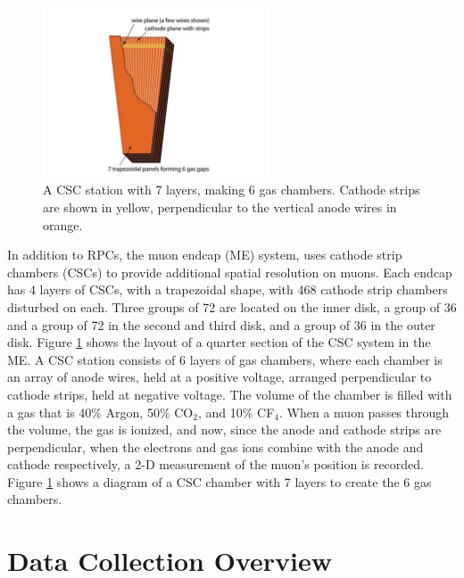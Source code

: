 \begin{figure}[h]
   \centering
  \includegraphics[width=0.6\textwidth]{Figures/CMS_Diagrams/Muon__CSC.pdf}
  \caption{A CSC station with 7 layers, making 6 gas chambers.
    Cathode strips are shown in yellow, perpendicular to the vertical
    anode wires in orange. } \label{fig:muon_csc_layout}
\end{figure}

\par In addition to RPCs, the muon endcap (ME) system, uses cathode
strip chambers (CSCs) to provide additional spatial resolution on
muons.  Each endcap has 4 layers of CSCs, with a trapezoidal shape,
with 468 cathode strip chambers disturbed on each.  Three groups of 72
are located on the inner disk, a group of 36 and a group of 72 in the
second and third disk, and a group of 36 in the outer disk.  Figure
\ref{fig:muon_csc_layout} shows the layout of a quarter section of the
CSC system in the ME.  A CSC station consists of 6 layers of gas
chambers, where each chamber is an array of anode wires, held at a
positive voltage, arranged perpendicular to cathode strips, held at
negative voltage.  The volume of the chamber is filled with a gas that 
is 40$\%$ Argon, 50$\%$ CO$_{2}$, and 10$\%$ CF$_{4}$.  When a muon
passes through the volume, the gas is ionized, and now, since the
anode and cathode strips are perpendicular, when the electrons and gas
ions combine with the anode and cathode respectively, a 2-D
measurement of the muon's position is recorded.  Figure
\ref{fig:muon_csc_layout} shows a diagram of a CSC chamber with 7
layers to create the 6 gas chambers.  

\section{Data Collection Overview}
\label{data_collection_description}

